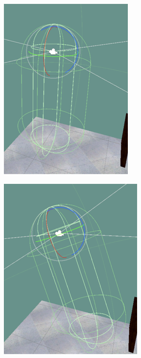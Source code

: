 \begin{itemize}
    \begin{figure}[!htb]
        \centering
        \begin{minipage}{0.45\textwidth}
            \centering
            \includegraphics[width = 0.8\linewidth]{Resultados/envelope1.png}
            \label{fig:user_straight}
        \end{minipage}
        \begin{minipage}{0.45\textwidth}
            \centering
            \includegraphics[width = 0.8\linewidth]{Resultados/envelope2.png}

\end{minipage}
\end{figure}
\end{itemize}
